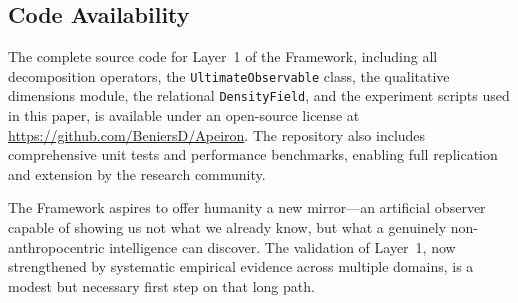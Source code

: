 \subsection*{Code Availability}
The complete source code for Layer~1 of the \Apeiron{} Framework, including all decomposition operators, the \texttt{UltimateObservable} class, the qualitative dimensions module, the relational \texttt{DensityField}, and the experiment scripts used in this paper, is available under an open-source license at \url{https://github.com/BeniersD/Apeiron}. The repository also includes comprehensive unit tests and performance benchmarks, enabling full replication and extension by the research community.

The \Apeiron{} Framework aspires to offer humanity a new mirror—an artificial observer capable of showing us not what we already know, but what a genuinely non-anthropocentric intelligence can discover. The validation of Layer~1, now strengthened by systematic empirical evidence across multiple domains, is a modest but necessary first step on that long path.